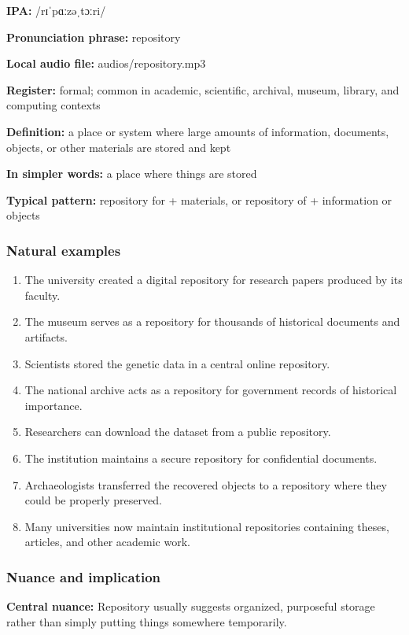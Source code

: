 \documentclass[11pt]{article}
\begin{document}
\textbf{IPA:} /rɪˈpɑːzəˌtɔːri/

\textbf{Pronunciation phrase:} repository

\textbf{Local audio file:} audios/repository.mp3

\textbf{Register:} formal; common in academic, scientific, archival, museum, library, and computing contexts

\textbf{Definition:} a place or system where large amounts of information, documents, objects, or other materials are stored and kept

\textbf{In simpler words:} a place where things are stored

\textbf{Typical pattern:} repository for + materials, or repository of + information or objects

\subsubsection{Natural examples}
\begin{enumerate}
  \item The university created a digital repository for research papers produced by its faculty.
  \item The museum serves as a repository for thousands of historical documents and artifacts.
  \item Scientists stored the genetic data in a central online repository.
  \item The national archive acts as a repository for government records of historical importance.
  \item Researchers can download the dataset from a public repository.
  \item The institution maintains a secure repository for confidential documents.
  \item Archaeologists transferred the recovered objects to a repository where they could be properly preserved.
  \item Many universities now maintain institutional repositories containing theses, articles, and other academic work.
\end{enumerate}

\subsubsection{Nuance and implication}
\textbf{Central nuance:} Repository usually suggests organized, purposeful storage rather than simply putting things somewhere temporarily.
\end{document}
